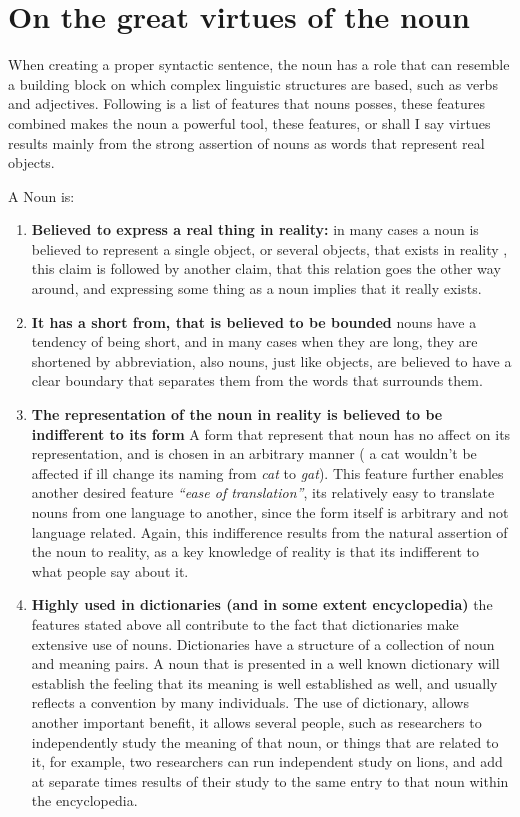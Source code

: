 \documentclass[10pt]{article}
\begin{document}
\section*{On the great virtues of the noun}

When creating a proper syntactic sentence, the noun has a role that can resemble a building block on which complex linguistic structures are based, such as verbs and adjectives. Following is a list of features that nouns posses,  these features combined makes the noun a powerful tool, these features, or shall I say virtues results mainly from the strong assertion of nouns as words that represent real objects.

A Noun is:
\begin{enumerate}
\item
\textbf{ Believed to express a real thing in reality:} in many cases a noun is believed to represent a single object, or several  objects, that exists in reality , this claim is followed by another claim, that this relation goes the other way around, and expressing some thing as a noun implies that it really exists.
\item
\textbf{It has a short from, that is believed to be bounded} nouns have a tendency of being short, and in many cases when they are long, they are shortened by abbreviation, also nouns, just like objects, are believed to have a clear boundary that separates them from the words that surrounds them.

\item
\textbf{ The representation of the noun in reality is believed to be indifferent to its form} A form  that represent that noun has no affect on its representation, and is chosen in an arbitrary manner ( a cat wouldn't be affected if ill change its naming from \textit{cat} to  \textit{gat}). This feature further enables another desired feature \textit{“ease of translation”}, its relatively easy to translate nouns from one language to another, since the form itself is arbitrary and not language related. Again, this indifference results from the natural assertion of the noun to reality, as a key knowledge of reality is that its indifferent to what people say about it.

\item
\textbf{ Highly used in dictionaries (and in some extent encyclopedia)} the features stated above all contribute to the fact that dictionaries make extensive use of nouns. Dictionaries have a structure of a collection of noun and meaning pairs. A noun that is presented in a well known dictionary will establish the feeling that its meaning is well established as well, and usually reflects a convention by many individuals. The use of dictionary, allows another important benefit, it allows several people, such as researchers to independently study the meaning of that noun, or things that are related to it, for example, two researchers can run independent study on lions, and add at separate times results of their study to the same  entry to that noun within the encyclopedia.


\end{enumerate}
\end{document}
